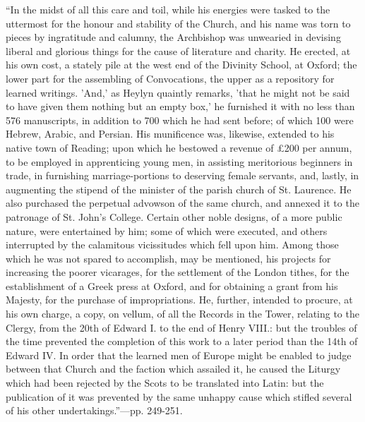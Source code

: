 ``In the midst of all this care and
toil, while his energies were tasked to the uttermost for the honour and
stability of the Church, and his name was torn to pieces by ingratitude
and calumny, the Archbishop was unwearied in devising liberal and
glorious things for the cause of literature and charity. He erected, at
his own cost, a stately pile at the west end of the Divinity School, at
Oxford; the lower part for the assembling of Convocations, the upper as
a repository for learned writings. 'And,' as Heylyn quaintly remarks, 'that
he might not be said to have given them nothing but an empty box,' he
furnished it with no less than 576 manuscripts, in addition to 700 which
he had sent before; of which 100 were Hebrew, Arabic, and Persian. His
munificence was, likewise, extended to his native town of Reading; upon
which he bestowed a revenue of £200 per annum, to be employed in
apprenticing young men, in assisting meritorious beginners in trade, in
furnishing marriage-portions to deserving female servants, and, lastly,
in augmenting the stipend of the minister of the parish church of St.
Laurence. He also purchased the perpetual advowson of the same church,
and annexed it to the patronage of St. John's College. Certain other
noble designs, of a more public nature, were entertained by him; some of
which were executed, and others interrupted by the calamitous
vicissitudes which fell upon him. Among those which he was not spared to
accomplish, may be mentioned, his projects for increasing the poorer
vicarages, for the settlement of the London tithes, for the
establishment of a Greek press at Oxford, and for obtaining a grant from
his Majesty, for the purchase of impropriations. He, further, intended
to procure, at his own charge, a copy, on vellum, of all the Records in
the Tower, relating to the Clergy, from the 20th of Edward I. to the end
of Henry VIII.: but the troubles of the time prevented the completion of
this work to a later period than the 14th of Edward IV. In order that
the learned men of Europe might be enabled to judge between that Church
and the faction which assailed it, he caused the Liturgy which had been
rejected by the Scots to be translated into Latin: but the publication
of it was prevented by the same unhappy cause which stifled several of
his other undertakings.''—pp. 249-251.

